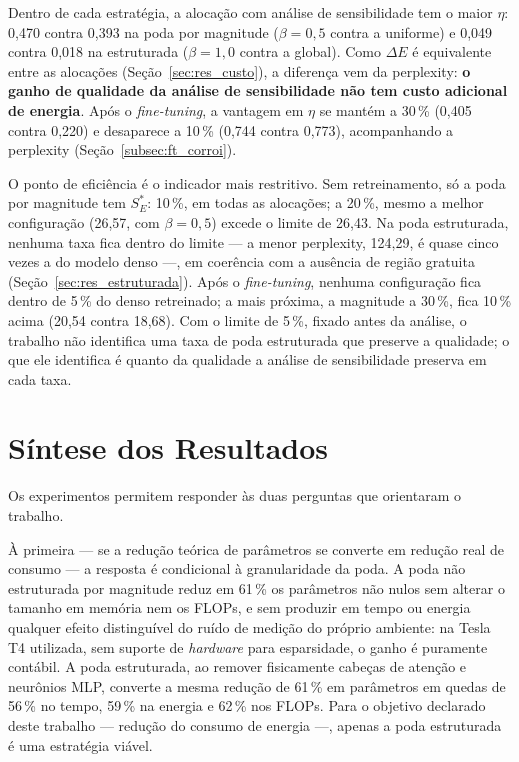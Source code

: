 Dentro de cada estratégia, a alocação com análise de sensibilidade tem o maior $\eta$:
0,470 contra 0,393 na poda por magnitude ($\beta = 0{,}5$ contra a uniforme) e 0,049
contra 0,018 na estruturada ($\beta = 1{,}0$ contra a global). Como $\Delta E$ é
equivalente entre as alocações (Seção~\ref{sec:res_custo}), a diferença vem da
perplexity: \textbf{o ganho de qualidade da análise de sensibilidade não tem custo
adicional de energia}. Após o \textit{fine-tuning}, a vantagem em $\eta$ se mantém a
30\,\% (0,405 contra 0,220) e desaparece a 10\,\% (0,744 contra 0,773), acompanhando a
perplexity (Seção~\ref{subsec:ft_corroi}).

O ponto de eficiência é o indicador mais restritivo. Sem retreinamento, só a poda por
magnitude tem $S^*_E$: 10\,\%, em todas as alocações; a 20\,\%, mesmo a melhor
configuração (26,57, com $\beta = 0{,}5$) excede o limite de 26,43. Na poda estruturada,
nenhuma taxa fica dentro do limite --- a menor perplexity, 124,29, é quase cinco vezes a
do modelo denso ---, em coerência com a ausência de região gratuita
(Seção~\ref{sec:res_estruturada}). Após o \textit{fine-tuning}, nenhuma configuração fica
dentro de 5\,\% do denso retreinado; a mais próxima, a magnitude a 30\,\%, fica 10\,\%
acima (20,54 contra 18,68). Com o limite de 5\,\%, fixado antes da análise, o trabalho não
identifica uma taxa de poda estruturada que preserve a qualidade; o que ele identifica é
quanto da qualidade a análise de sensibilidade preserva em cada taxa.

\section{Síntese dos Resultados}\label{sec:res_sintese}

Os experimentos permitem responder às duas perguntas que orientaram o
trabalho.

À primeira --- se a redução teórica de parâmetros se converte em redução real
de consumo --- a resposta é condicional à granularidade da poda. A poda não
estruturada por magnitude reduz em 61\,\% os parâmetros não nulos sem
alterar o tamanho em memória nem os FLOPs, e sem produzir em tempo ou energia
qualquer efeito distinguível do ruído de medição do próprio ambiente: na Tesla
T4 utilizada, sem suporte de \textit{hardware} para esparsidade, o ganho é
puramente contábil. A poda estruturada, ao remover
fisicamente cabeças de atenção e neurônios MLP, converte a mesma redução de
61\,\% em parâmetros em quedas de 56\,\% no tempo, 59\,\% na energia e 62\,\%
nos FLOPs. Para o objetivo declarado deste trabalho --- redução do consumo de
energia ---, apenas a poda estruturada é uma estratégia viável.

